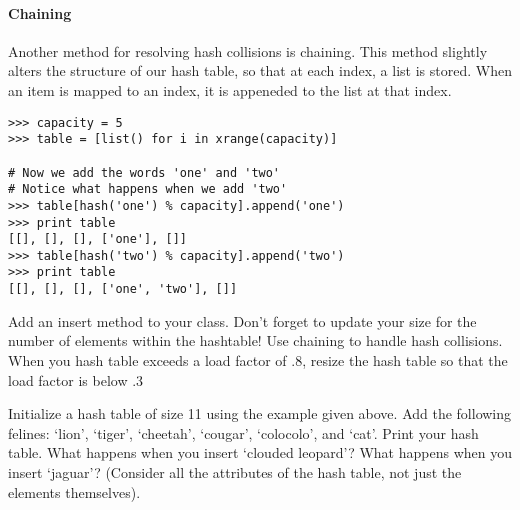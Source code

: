 \paragraph{Chaining}
Another method for resolving hash collisions is chaining.
This method slightly alters the structure of our hash table, so that at each index, a list is stored.
When an item is mapped to an index, it is appeneded to the list at that index.
\begin{lstlisting}
>>> capacity = 5
>>> table = [list() for i in xrange(capacity)]

# Now we add the words 'one' and 'two'
# Notice what happens when we add 'two'
>>> table[hash('one') % capacity].append('one')
>>> print table
[[], [], [], ['one'], []]
>>> table[hash('two') % capacity].append('two')
>>> print table
[[], [], [], ['one', 'two'], []]
\end{lstlisting}


\begin{problem}
Add an insert method to your  class. Don't forget to update your size for the number of elements within the hashtable!
Use chaining to handle hash collisions.
When you hash table exceeds a load factor of .8, resize the hash table so that the load factor is below .3

Initialize a hash table of size 11 using the example  given above.
Add the following felines: `lion', `tiger', `cheetah', `cougar', `colocolo', and `cat'.
Print your hash table. What happens when you insert `clouded leopard'?
What happens when you insert `jaguar'? (Consider all the attributes of the hash table, not just the elements themselves).
\label{prob:Basic hash insert}
\end{problem}